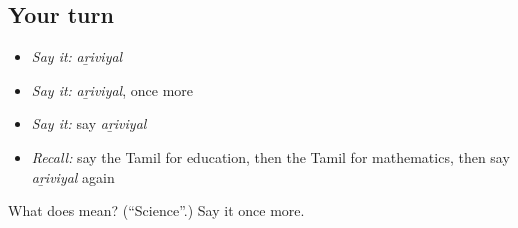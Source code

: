 \subsection*{Your turn}
\begin{itemize}
\raggedright
  \item \emph{Say it:} \emph{aṟiviyal}
  \item \emph{Say it:} \emph{aṟiviyal}, once more
  \item \emph{Say it:} say \emph{aṟiviyal}
  \item \emph{Recall:} say the Tamil for education, then the Tamil for mathematics, then say \emph{aṟiviyal} again
\end{itemize}

\begin{tcolorbox}[breakable,colback=teal!4,colframe=teal!35!black,title={Before you move on}]
What does  mean? (\textquotedblleft{}Science\textquotedblright{}.) Say it once more.
\end{tcolorbox}
